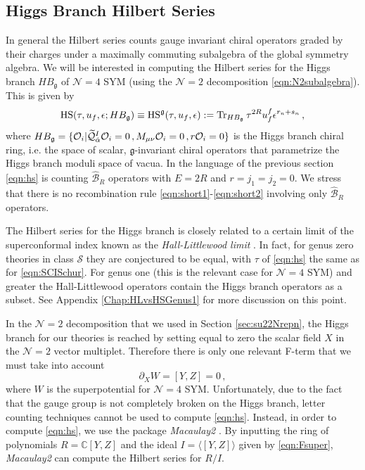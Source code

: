 \documentclass[main.tex]{subfiles}
\begin{document}
\subsection{Higgs Branch Hilbert Series}
In general the Hilbert series \cite{Benvenuti:2006qr,Feng:2007ur} counts gauge invariant chiral operators graded by their charges under a maximally commuting subalgebra of the global symmetry algebra. We will be interested in computing the Hilbert series for the Higgs branch $HB_{\mathfrak{g}}$ of $\mathcal{N}=4$ SYM (using the $\mathcal{N}=2$ decomposition \eqref{eqn:N2subalgebra}). This is given by
\begin{equation}\label{eqn:hs}
\textrm{HS}(\tau,u_f,\epsilon;HB_{\mathfrak{g}})\equiv\textrm{HS}^{\mathfrak{g}}(\tau,u_f,\epsilon): = \operatorname{Tr}_{HB_{\mathfrak{g}}}\tau^{2R}u_f^f\epsilon^{r_{n}+ s_{n}} \, ,
\end{equation}
where $HB_{\mathfrak{g}}=\{\mathcal{O}_i | \widetilde{\mathcal{Q}}^{I}_{\dot{\alpha}}\mathcal{O}_i=0\,, M_{\mu\nu} \mathcal{O}_i=0\,,r\mathcal{O}_i =0 \}$ is the Higgs branch chiral ring, i.e. the space of scalar, $\mathfrak{g}$-invariant chiral operators that parametrize the Higgs branch moduli space of vacua. In the language of the previous section \eqref{eqn:hs} is counting $\hat{\mathcal{B}}_R$ operators with $E=2R$ and $r=j_1=j_2=0$. We stress that there is no recombination rule \eqref{eqn:short1}-\eqref{eqn:short2} involving only $\hat{\mathcal{B}}_R$ operators. 

The Hilbert series for the Higgs branch is closely related to a certain limit of the superconformal index known as the \textit{Hall-Littlewood limit} \cite{Gadde:2011uv}. In fact, for genus zero theories in class $\mathcal{S}$ they are conjectured to be equal, with $\tau$ of \eqref{eqn:hs} the same as for \eqref{eqn:SCISchur}. For genus one (this is the relevant case for $\mathcal{N}=4$ SYM) and greater the Hall-Littlewood operators contain the Higgs branch operators as a subset. See Appendix \ref{Chap:HLvsHSGenus1} for more discussion on this point.

In the $\mathcal{N}=2$ decomposition that we used in Section \ref{sec:su22Nrepn}, the Higgs branch for our theories is reached by setting equal to zero the scalar field $X$ in the $\mathcal{N}=2$ vector multiplet. Therefore there is only one relevant F-term that we must take into account
\begin{equation}\label{eqn:Fsuper}
\partial_{X}W = [Y,Z] = 0 \, ,
\end{equation}
where $W$ is the superpotential for $\mathcal{N}=4$ SYM. Unfortunately, due to the fact that the gauge group is not completely broken on the Higgs branch, letter counting techniques cannot be used to compute \eqref{eqn:hs}. Instead, in order to compute \eqref{eqn:hs}, we use the package \textit{Macaulay2} \cite{M2}. By inputting the ring of polynomials $R=\mathbb{C}[Y,Z]$ and the ideal $I=\langle[Y,Z]\rangle$ given by \eqref{eqn:Fsuper}, \textit{Macaulay2} can compute the Hilbert series for $R/I$.
\end{document}
